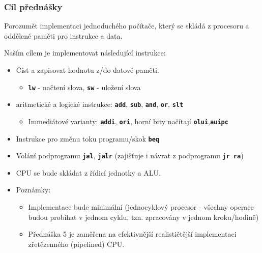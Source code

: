\documentclass{beamer}
\begin{document}
\begin{frame}
\frametitle{Cíl přednášky}

Porozumět implementaci jednoduchého počítače, který se skládá z procesoru a oddělené paměti pro instrukce a data.

Naším cílem je implementovat následující instrukce:

\begin{itemize}
\item Číst a zapisovat hodnotu z/do datové paměti.
\begin{itemize}
\item \textbf{\texttt{lw}} - načtení slova, \textbf{\texttt{sw}} - uložení slova
\end{itemize}
\item aritmetické a logické instrukce: \textbf{\texttt{add}}, \textbf{\texttt{sub}}, \textbf{\texttt{and}}, \textbf{\texttt{or}}, \textbf{\texttt{slt}}
\begin{itemize}
\item Immediátové varianty: \textbf{\texttt{addi}}, \textbf{\texttt{ori}}, horní bity načítají \textbf{\texttt{olui}},\textbf{\texttt{auipc}}
\end{itemize}
\item Instrukce pro změnu toku programu/skok \textbf{\texttt{beq}}
\item Volání podprogramu \textbf{\texttt{jal}}, \textbf{\texttt{jalr}} (zajišťuje i návrat z podprogramu \textbf{\texttt{jr~ra}})
\item CPU se bude skládat z řídicí jednotky a ALU.
\item Poznámky:
\begin{itemize}
\item Implementace bude minimální (jednocyklový procesor - všechny operace budou probíhat v jednom cyklu, tzn. zpracovány v jednom kroku/hodině)
\item Přednáška 5 je zaměřena na efektivnější realističtější implementaci zřetězenného (pipelined) CPU.
\end{itemize}
\end{itemize}

\end{frame}
\end{document}
